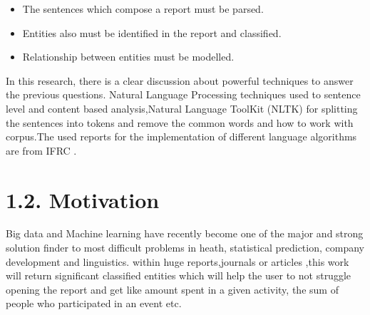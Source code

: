 \begin{itemize}
\item The sentences which compose a report  must be parsed.
\item  Entities also must be identified in the report and classified.
\item Relationship between entities must be modelled.
\end{itemize}
In this research, there is a clear discussion about powerful techniques to answer the previous questions.  Natural  Language Processing techniques used to sentence level and content based analysis,Natural Language ToolKit  (NLTK) for splitting the sentences into tokens and remove the common words and how to work with corpus.The used reports for the implementation of different language algorithms are from IFRC .

\section*{1.2. Motivation}
Big data and Machine learning have recently become one of the major and strong solution finder to most difficult problems in heath, statistical prediction, company development and linguistics.
within huge reports,journals or articles ,this work will return significant  classified entities which will help the user to not struggle opening the report and get like amount spent in a given activity, the sum of people who participated in an event etc.




%
% 

